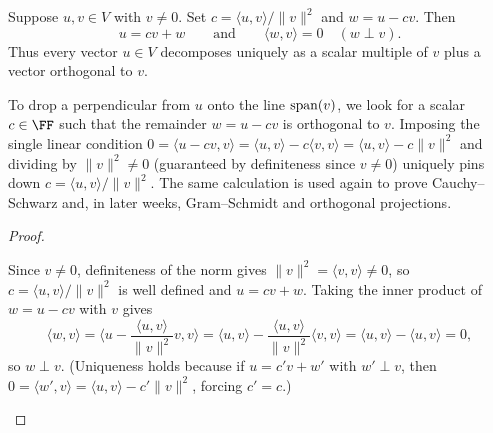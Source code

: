 \documentclass[10pt]{scrartcl}
\newcommand{\ip}[2]{\langle #1,#2\rangle}
\begin{document}
\begin{proposition*}
  Suppose $u,v\in V$ with $v\ne 0$. Set $c=\ip uv/\|v\|^2$ and $w=u-cv$. Then
  \[
    u = cv + w \qquad\text{and}\qquad \ip wv = 0\quad (w\perp v).
  \]
  Thus every vector $u\in V$ decomposes uniquely as a scalar multiple of $v$ plus a vector orthogonal to $v$.
\end{proposition*}
\begin{ideabox}
  To drop a perpendicular from $u$ onto the line $\operatorname{span}(v)$, we look for a scalar $c\in\FF$ such that the remainder $w=u-cv$ is orthogonal to $v$. Imposing the single linear condition $0=\ip{u-cv}{v}=\ip uv-c\ip vv=\ip uv-c\|v\|^2$ and dividing by $\|v\|^2\ne 0$ (guaranteed by definiteness since $v\ne 0$) uniquely pins down $c=\ip uv/\|v\|^2$. The same calculation is used again to prove Cauchy--Schwarz and, in later weeks, Gram--Schmidt and orthogonal projections.
\end{ideabox}
\begin{proof}
  \begin{steps}
    \ii Since $v\ne 0$, definiteness of the norm gives $\|v\|^2=\ip vv\ne 0$, so $c=\ip uv/\|v\|^2$ is well defined and $u=cv+w$.
    \ii Taking the inner product of $w=u-cv$ with $v$ gives
    \[
      \ip wv = \ip{u - \frac{\ip uv}{\|v\|^2}v}{v} = \ip uv - \frac{\ip uv}{\|v\|^2}\ip vv = \ip uv - \ip uv = 0,
    \]
    so $w\perp v$. (Uniqueness holds because if $u=c'v+w'$ with $w'\perp v$, then $0=\ip{w'}{v}=\ip uv-c'\|v\|^2$, forcing $c'=c$.)
  \end{steps}
\end{proof}
\end{document}
